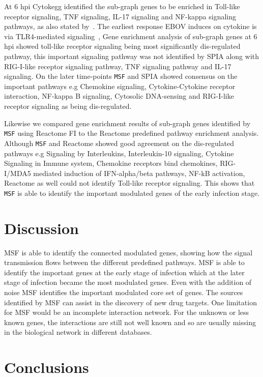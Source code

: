 \documentclass[10pt,a4paper,twocolumn]{article}
\begin{document}
At 6 hpi Cytokegg identified the sub-graph genes to be enriched in
Toll-like receptor signaling, TNF signaling, IL-17 signaling and
NF-kappa signaling pathways, as also stated by~\cite{Olejnik}. The
earliest response EBOV induces on cytokine is via TLR4-mediated
signaling~\cite{Olejnik}, Gene enrichment analysis of sub-graph genes
at 6 hpi showed toll-like receptor signaling being most significantly
dis-regulated pathway, this important signaling pathway was not
identified by SPIA along with RIG-I-like receptor signaling pathway,
TNF signaling pathway and IL-17 signaling. On the later time-points \texttt{MSF} and SPIA showed
consensus on the important pathways e.g Chemokine signaling,
Cytokine-Cytokine receptor interaction, NF-kappa B signaling,
Cytosolic DNA-sensing and RIG-I-like receptor signaling as being
dis-regulated.

Likewise we compared gene enrichment results of sub-graph genes
identified by \texttt{MSF} using Reactome FI to the Reactome
predefined pathway enrichment analysis. Although \texttt{MSF} and
Reactome showed good agreement on the dis-regulated pathways e.g
Signaling by Interleukins, Interleukin-10 signaling, Cytokine
Signaling in Immune system, Chemokine receptors bind chemokines,
RIG-I/MDA5 mediated induction of IFN-alpha/beta pathways, NF-kB
activation, Reactome as well could not identify Toll-like receptor
signaling. This shows that
\texttt{MSF} is able to identify the important modulated genes of the early infection stage.


\section*{Discussion}

MSF is able to identify the connected modulated genes, showing how the signal transmission flows between the different predefined pathways. MSF is able to identify the important genes at the early stage of infection which at the later stage of infection became the most modulated genes. Even with the addition of noise MSF identifies the important modulated core set of genes. The sources identified by MSF can assist in the discovery of new drug targets. One limitation for MSF would be an incomplete interaction network. For the unknown or less known genes, the interactions are still not well known and so are usually missing in the biological network in different databases.


\section*{Conclusions}
\end{document}
